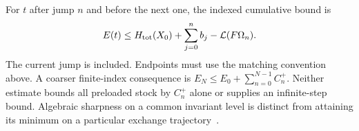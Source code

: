 For $t$ after jump $n$ and before the next one, the indexed cumulative bound is
\begin{equation}\label{eq:a22}%
\begin{gathered}
E(t)\le H_{\rm tot}(X_0)+\sum_{j=0}^{n}b_j-\mathcal L(F\Omega_n).
\end{gathered}
\end{equation}
The current jump is included. Endpoints must use the matching convention above. A coarser finite-index consequence is $E_N\le E_0+\sum_{n=0}^{N-1}C_n^+$. Neither estimate bounds all preloaded stock by $C_n^+$ alone or supplies an infinite-step bound. Algebraic sharpness on a common invariant level is distinct from attaining its minimum on a particular exchange trajectory~\cite[Section 3]{pc}.
